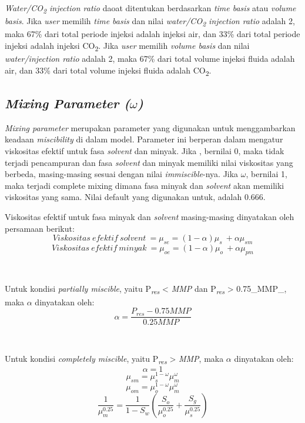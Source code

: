 \documentclass[
]{book}
\begin{document}
\emph{Water/CO\textsubscript{2} injection ratio} daoat ditentukan berdasarkan \emph{time basis} atau \emph{volume basis}. Jika \emph{user} memilih \emph{time basis} dan nilai \emph{water/CO\textsubscript{2} injection ratio} adalah 2, maka 67\% dari total periode injeksi adalah injeksi air, dan 33\% dari total periode injeksi adalah injeksi CO\textsubscript{2}. Jika \emph{user} memilih \emph{volume basis} dan nilai \emph{water/injection ratio} adalah 2, maka 67\% dari total volume injeksi fluida adalah air, dan 33\% dari total volume injeksi fluida adalah CO\textsubscript{2}.

\hypertarget{mixing-parameter-omega}{%
\subsection{\texorpdfstring{\emph{Mixing Parameter (\(\omega\))}}{Mixing Parameter (\textbackslash omega)}}\label{mixing-parameter-omega}}

\emph{Mixing parameter} merupakan parameter yang digunakan untuk menggambarkan keadaan \emph{miscibility} di dalam model. Parameter ini berperan dalam mengatur viskositas efektif untuk fasa \emph{solvent} dan minyak. Jika , bernilai 0, maka tidak terjadi pencampuran dan fasa \emph{solvent} dan minyak memiliki nilai viskositas yang berbeda, masing-masing sesuai dengan nilai \emph{immiscible}-nya. Jika \(\omega\), bernilai 1, maka terjadi complete mixing dimana fasa minyak dan \emph{solvent} akan memiliki viskositas yang sama. Nilai default yang digunakan untuk, adalah 0.666.

Viskositas efektif untuk fasa minyak dan \emph{solvent} masing-masing dinyatakan oleh persamaan berikut:
\[Viskositas\ efektif\ solvent\ = \mu_{se} = (1-\alpha)\mu_s\ + \alpha\mu_{sm} \]
\[Viskositas\ efektif\ minyak\ = \mu_{oe} = (1-\alpha)\mu_o\ + \alpha\mu_{pm} \]

~

Untuk kondisi \emph{partially miscible}, yaitu P\textsubscript{\emph{res}} \textless{} \emph{MMP} dan P\textsubscript{\emph{res}} \textgreater{} 0.75\_MMP\_, maka \(\alpha\) dinyatakan oleh:
\[\alpha = \frac{P_{res}-0.75MMP}{0.25MMP}\]

~

Untuk kondisi \emph{completely miscible}, yaitu P\textsubscript{\emph{res}} \textgreater{} \emph{MMP}, maka \(\alpha\) dinyatakan oleh:
\[\alpha = 1\]
\[\mu_{sm} = \mu_s^{1-\omega}\mu_m^\omega\]
\[\mu_{om} = \mu_o^{1-\omega}\mu_m^\omega\]
\[\frac{1}{\mu_m^{0.25}} = \frac{1}{1-S_w} \left(\frac{S_o}{\mu_o^{0.25}} + \frac{S_g}{\mu_s^{0.25}} \right)\]
\end{document}
